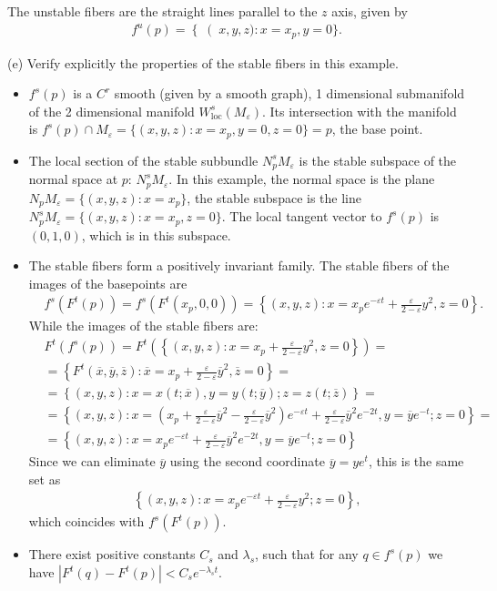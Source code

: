 \begin{solution}[9.5]
\begin{enumerate}
The unstable fibers are the straight lines parallel to the $z$ axis, given by
\begin{align}
f^u(p) = \left \{ \right (x,y,z) : x = x_p, y=0\}.
\end{align}

(e) Verify explicitly the properties of the stable fibers in this example.
\begin{itemize}
    \item $f^s(p)$ is a $C^r$ smooth (given by a smooth graph), 1 dimensional submanifold of the 2 dimensional manifold $W^s_\text{loc}(M_\varepsilon)$. Its intersection with the manifold is $f^s(p)\cap M_\varepsilon = \{(x,y,z):x=x_p, y=0, z=0 \} = p $, the base point.
    \item The local section of the stable subbundle $N^s_pM_\varepsilon$ is the stable subspace of the normal space at $p$: $N^s_pM_\varepsilon$. In this example, the normal space is the plane $N_p M_\varepsilon = \{ (x,y,z) : x=x_p\}$, the stable subspace is the line $N^s_p M_\varepsilon = \{ (x,y,z) : x=x_p, z=0\}$. The local tangent vector to $f^s(p)$ is $(0, 1, 0)$, which is in this subspace. 
    \item The stable fibers form a positively invariant family.
    The stable fibers of the images of the basepoints are
    \begin{align}
        &f^s(F^t(p)) = f^s(F^t(x_p,0,0)) = \left\{ (x,y,z): x = x_p e^{-\varepsilon t}+ \frac{\varepsilon}{2-\varepsilon}y^2, z=0 \right\}. 
    \end{align}
    While the images of the stable fibers are:
    \begin{align}
        &F^t(f^s(p)) = F^t\left(\left\{ (x,y,z): x = x_p+ \frac{\varepsilon}{2-\varepsilon}y^2, z=0 \right\}\right) = \\
    &=\left\{ F^t(\overline{x},\overline{y},\overline{z}): \overline{x} = x_p + \frac{\varepsilon}{2-\varepsilon}\overline{y}^2, \overline{z}=0 \right\} = \\
    & = \left\{ (x,y,z): x = x(t; \overline{x}), y= y(t;\overline{y}); z=z(t;\overline{z}) \right\} = \\
    &= \left\{ (x,y,z): x = \left(x_p + \frac{\varepsilon}{2-\varepsilon}\overline{y}^2 - \frac{\varepsilon}{2-\varepsilon}\overline{y}^2 \right)e^{-\varepsilon t} + \frac{\varepsilon}{2-\varepsilon}\overline{y}^2 e^{-2t}, y= \overline{y}e^{-t}; z = 0 \right\} =\\  
    & = \left\{ (x,y,z): x = x_p e^{-\varepsilon t} + \frac{\varepsilon}{2-\varepsilon}\overline{y}^2 e^{-2t}, y= \overline{y}e^{-t}; z = 0 \right\}
    \end{align}
    Since we can eliminate $\overline{y}$ using the second coordinate $\overline{y}=ye^t$, this is the same set as
    \begin{align}
    \left\{ (x,y,z): x = x_p e^{-\varepsilon t} + \frac{\varepsilon}{2-\varepsilon}y^2 ; z = 0 \right\},
    \end{align}
    which coincides with $f^s(F^t(p))$.
    \item There exist positive constants $C_s$ and $\lambda_s$, such that for any $q \in f^s(p)$ we have $|F^t(q)-F^t(p)|< C_s e^{-\lambda_s t}$.
    

\end{itemize}
\end{enumerate}
\end{solution}
